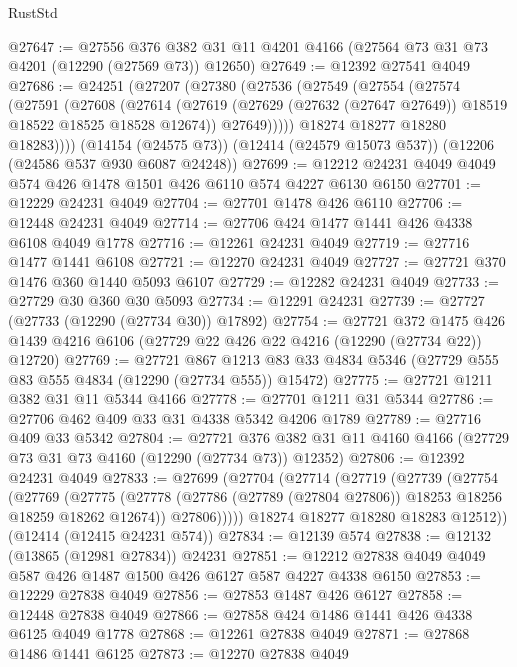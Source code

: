 \begin{lexlean}{RustStd}
\begin{coremodule}
@27647 := @27556
    @376
    @382
    @31
    @11
    @4201
    @4166
    (@27564 @73 @31 @73 @4201 (@12290 (@27569 @73)) @12650)
@27649 := @12392 @27541 @4049
@27686 := @24251
    (@27207
      (@27380
        (@27536
          (@27549
            (@27554
              (@27574
                (@27591
                  (@27608
                    (@27614
                      (@27619 (@27629 (@27632 (@27647 @27649)) @18519 @18522 @18525 @18528 @12674))
                      @27649)))))
            @18274
            @18277
            @18280
            @18283))))
    (@14154 (@24575 @73))
    (@12414 (@24579 @15073 @537))
    (@12206 (@24586 @537 @930 @6087 @24248))
@27699 := @12212 @24231 @4049 @4049 @574 @426 @1478 @1501 @426 @6110 @574 @4227 @6130 @6150
@27701 := @12229 @24231 @4049
@27704 := @27701 @1478 @426 @6110
@27706 := @12448 @24231 @4049
@27714 := @27706 @424 @1477 @1441 @426 @4338 @6108 @4049 @1778
@27716 := @12261 @24231 @4049
@27719 := @27716 @1477 @1441 @6108
@27721 := @12270 @24231 @4049
@27727 := @27721 @370 @1476 @360 @1440 @5093 @6107
@27729 := @12282 @24231 @4049
@27733 := @27729 @30 @360 @30 @5093
@27734 := @12291 @24231
@27739 := @27727 (@27733 (@12290 (@27734 @30)) @17892)
@27754 := @27721
    @372
    @1475
    @426
    @1439
    @4216
    @6106
    (@27729 @22 @426 @22 @4216 (@12290 (@27734 @22)) @12720)
@27769 := @27721
    @867
    @1213
    @83
    @33
    @4834
    @5346
    (@27729 @555 @83 @555 @4834 (@12290 (@27734 @555)) @15472)
@27775 := @27721 @1211 @382 @31 @11 @5344 @4166
@27778 := @27701 @1211 @31 @5344
@27786 := @27706 @462 @409 @33 @31 @4338 @5342 @4206 @1789
@27789 := @27716 @409 @33 @5342
@27804 := @27721
    @376
    @382
    @31
    @11
    @4160
    @4166
    (@27729 @73 @31 @73 @4160 (@12290 (@27734 @73)) @12352)
@27806 := @12392 @24231 @4049
@27833 := @27699
    (@27704
      (@27714
        (@27719
          (@27739
            (@27754
              (@27769
                (@27775
                  (@27778 (@27786 (@27789 (@27804 @27806)) @18253 @18256 @18259 @18262 @12674))
                  @27806)))))
        @18274
        @18277
        @18280
        @18283
        @12512))
    (@12414 (@12415 @24231 @574))
@27834 := @12139 @574
@27838 := @12132 (@13865 (@12981 @27834)) @24231
@27851 := @12212 @27838 @4049 @4049 @587 @426 @1487 @1500 @426 @6127 @587 @4227 @4338 @6150
@27853 := @12229 @27838 @4049
@27856 := @27853 @1487 @426 @6127
@27858 := @12448 @27838 @4049
@27866 := @27858 @424 @1486 @1441 @426 @4338 @6125 @4049 @1778
@27868 := @12261 @27838 @4049
@27871 := @27868 @1486 @1441 @6125
@27873 := @12270 @27838 @4049

\end{coremodule}
\end{lexlean}
